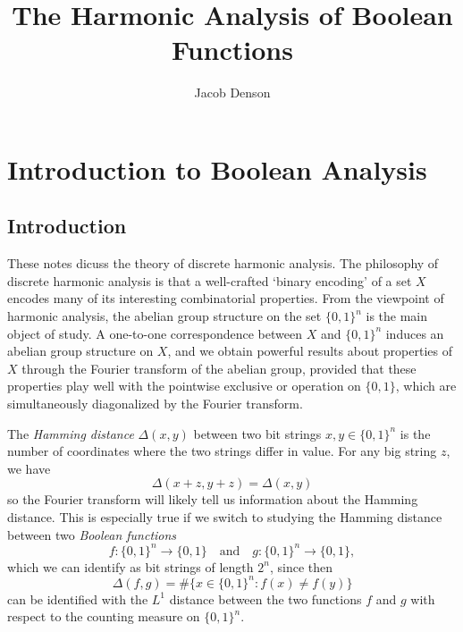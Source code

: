 

\title{The Harmonic Analysis of Boolean Functions}
\author{Jacob Denson}




\maketitle

\tableofcontents


\chapter{Introduction to Boolean Analysis}

\section{Introduction}

These notes dicuss the theory of discrete harmonic analysis. The philosophy of discrete harmonic analysis is that a well-crafted `binary encoding' of a set $X$ encodes many of its interesting combinatorial properties. From the viewpoint of harmonic analysis, the abelian group structure on the set $\{ 0,1 \}^n$ is the main object of study. A one-to-one correspondence between $X$ and $\{ 0,1 \}^n$ induces an abelian group structure on $X$, and we obtain powerful results about properties of $X$ through the Fourier transform of the abelian group, provided that these properties play well with the pointwise exclusive or operation on $\{ 0, 1 \}$, which are simultaneously diagonalized by the Fourier transform.

\begin{example}
    The \emph{Hamming distance} $\Delta(x,y)$ between two bit strings $x, y \in \{ 0, 1 \}^n$ is the number of coordinates where the two strings differ in value. For any big string $z$, we have
    \[ \Delta(x + z, y + z) = \Delta(x,y) \]
    so the Fourier transform will likely tell us information about the Hamming distance. This is especially true if we switch to studying the Hamming distance between two \emph{Boolean functions}
    \[ f: \{ 0, 1 \}^n \to \{ 0, 1 \} \quad\text{and}\quad g: \{ 0, 1 \}^n \to \{ 0, 1 \}, \]
    which we can identify as bit strings of length $2^n$, since then
    \[ \Delta(f,g) = \# \{ x \in \{ 0, 1 \}^n : f(x) \neq f(y) \} \]
    can be identified with the $L^1$ distance between the two functions $f$ and $g$ with respect to the counting measure on $\{ 0, 1 \}^n$.
\end{example}

